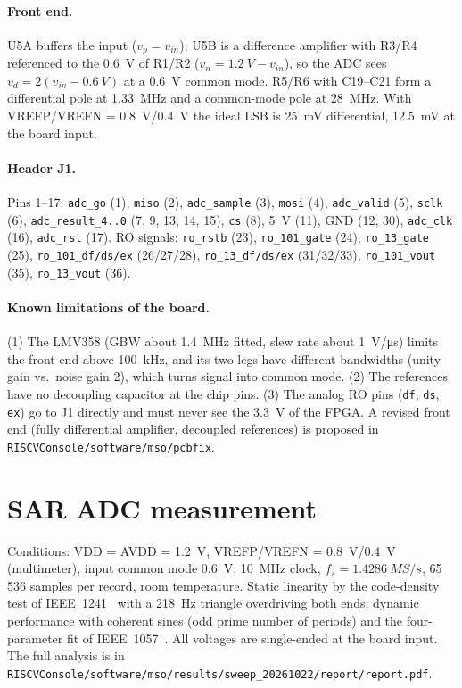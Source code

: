 \documentclass[10pt,a4paper]{article}
\begin{document}
\paragraph{Front end.} U5A buffers the input ($v_p = v_{in}$); U5B is a difference amplifier with
R3/R4 referenced to the \SI{0.6}{V} of R1/R2 ($v_n = \SI{1.2}{V} - v_{in}$), so the ADC sees
$v_d = 2(v_{in} - \SI{0.6}{V})$ at a \SI{0.6}{V} common mode. R5/R6 with C19--C21 form a differential pole at
\SI{1.33}{MHz} and a common-mode pole at \SI{28}{MHz}. With VREFP/VREFN = \SI{0.8}{V}/\SI{0.4}{V} the
ideal LSB is \SI{25}{mV} differential, \SI{12.5}{mV} at the board input.

\paragraph{Header J1.} Pins 1--17: \texttt{adc\_go} (1), \texttt{miso} (2), \texttt{adc\_sample} (3),
\texttt{mosi} (4), \texttt{adc\_valid} (5), \texttt{sclk} (6), \texttt{adc\_result\_4..0} (7, 9, 13, 14, 15),
\texttt{cs} (8), \SI{5}{V} (11), GND (12, 30), \texttt{adc\_clk} (16), \texttt{adc\_rst} (17). RO signals:
\texttt{ro\_rstb} (23), \texttt{ro\_101\_gate} (24), \texttt{ro\_13\_gate} (25), \texttt{ro\_101\_df/ds/ex}
(26/27/28), \texttt{ro\_13\_df/ds/ex} (31/32/33), \texttt{ro\_101\_vout} (35), \texttt{ro\_13\_vout} (36).

\paragraph{Known limitations of the board.} (1) The LMV358 (GBW about \SI{1.4}{MHz} fitted, slew rate about
\SI{1}{V/\micro s}) limits the front end above \SI{100}{kHz}, and its two legs have different bandwidths
(unity gain vs.\ noise gain 2), which turns signal into common mode. (2) The references have no
decoupling capacitor at the chip pins. (3) The analog RO pins (\texttt{df}, \texttt{ds}, \texttt{ex})
go to J1 directly and must never see the \SI{3.3}{V} of the FPGA. A revised front end (fully differential
amplifier, decoupled references) is proposed in \nolinkurl{RISCVConsole/software/mso/pcbfix}.

\section{SAR ADC measurement}
\label{sec:adc}
Conditions: VDD = AVDD = \SI{1.2}{V}, VREFP/VREFN = \SI{0.8}{V}/\SI{0.4}{V} (multimeter), input common mode
\SI{0.6}{V}, \SI{10}{MHz} clock, $f_s = \SI{1.4286}{MS/s}$, 65\,536 samples per record, room temperature.
Static linearity by the code-density test of IEEE~1241~\cite{ieee1241} with a \SI{218}{Hz} triangle
overdriving both ends; dynamic performance with coherent sines (odd prime number of periods) and the
four-parameter fit of IEEE~1057~\cite{ieee1057}. All voltages are single-ended at the board input. The
full analysis is in \nolinkurl{RISCVConsole/software/mso/results/sweep_20261022/report/report.pdf}.
\end{document}
